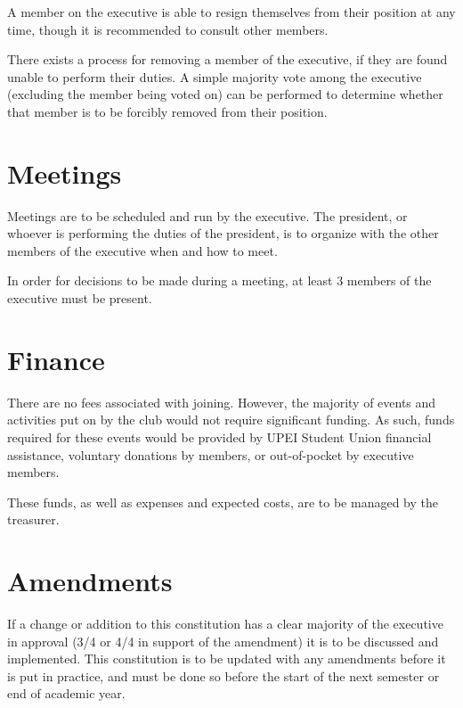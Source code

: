 \documentclass[11pt]{article}
\begin{document}
A member on the executive is able to resign themselves from their position at any time, though it is recommended to consult other members.

\vspace{2mm}
\noindent
There exists a process for removing a member of the executive, if they are found unable to perform their duties. A simple majority vote among the executive (excluding the member being voted on) can be performed to determine whether that member is to be forcibly removed from their position.

\section{Meetings}

Meetings are to be scheduled and run by the executive. The president, or whoever is performing the duties of the president, is to organize with the other members of the executive when and how to meet.

\vspace{2mm}
\noindent
In order for decisions to be made during a meeting, at least 3 members of the executive must be present.

\section{Finance}

There are no fees associated with joining. However, the majority of events and activities put on by the club would not require significant funding. As such, funds required for these events would be provided by UPEI Student Union financial assistance, voluntary donations by members, or out-of-pocket by executive members.

These funds, as well as expenses and expected costs, are to be managed by the treasurer.

\section{Amendments}

If a change or addition to this constitution has a clear majority of the executive in approval (3/4 or 4/4 in support of the amendment) it is to be discussed and implemented. This constitution is to be updated with any amendments before it is put in practice, and must be done so before the start of the next semester or end of academic year.
\end{document}
